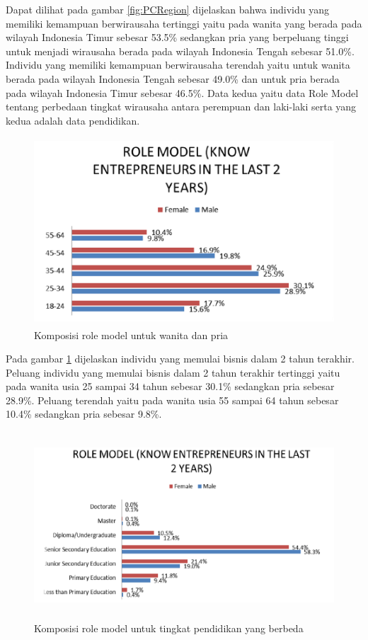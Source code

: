 Dapat dilihat pada gambar \ref{fig:PCRegion} dijelaskan bahwa individu yang memiliki kemampuan berwirausaha tertinggi yaitu pada wanita yang berada pada wilayah Indonesia Timur sebesar 53.5\% sedangkan pria yang berpeluang tinggi untuk menjadi wirausaha berada pada wilayah Indonesia Tengah sebesar 51.0\%. Individu yang memiliki kemampuan berwirausaha terendah yaitu untuk wanita berada pada wilayah Indonesia Tengah sebesar 49.0\% dan untuk pria berada pada wilayah Indonesia Timur sebesar 46.5\%. Data kedua yaitu data Role Model tentang perbedaan tingkat wirausaha antara perempuan dan laki-laki serta yang kedua adalah data pendidikan.

\begin{figure} [H]
	\centering  
	\includegraphics[width=12cm, height=7cm]{RMfemalemale} 
	\caption[Komposisi role model untuk wanita dan pria]{Komposisi role model untuk wanita dan pria} 
	\label{fig:RMfemalemale} 
\end{figure}


Pada gambar \ref{fig:RMfemalemale} dijelaskan individu yang memulai bisnis dalam 2 tahun terakhir. Peluang individu yang memulai bisnis dalam 2 tahun terakhir tertinggi yaitu pada wanita usia 25 sampai 34 tahun sebesar 30.1\% sedangkan pria sebesar 28.9\%. Peluang terendah yaitu pada wanita usia 55 sampai 64 tahun sebesar 10.4\% sedangkan pria sebesar 9.8\%.


\begin{figure} [H]
	\centering  
	\includegraphics[width=13cm, height=7cm]{RMpendidikan} 
	\caption[Komposisi role model untuk tingkat pendidikan yang berbeda]{Komposisi role model untuk tingkat pendidikan yang berbeda} 
	\label{fig:RMpendidikan} 
\end{figure}  


